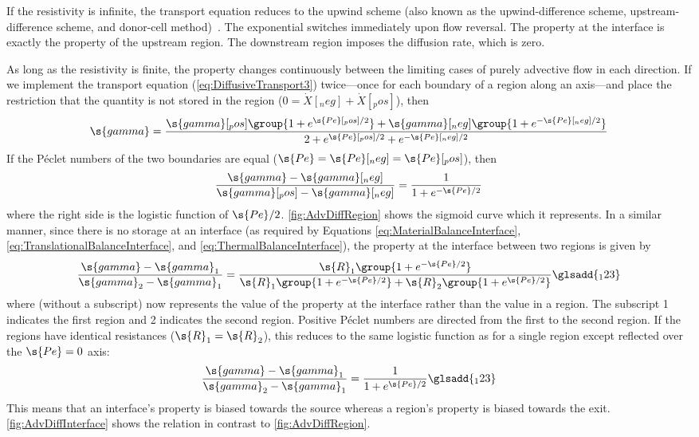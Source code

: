 If the resistivity is infinite, the transport equation reduces to the upwind scheme (also known as the upwind-difference scheme, upstream-difference scheme, and donor-cell method)~\cite{Patankar1980}. %
The exponential switches immediately upon flow reversal.  The property at the interface is exactly the property of the upstream region.  The downstream region imposes the diffusion rate, which is zero.

As long as the resistivity is finite, the property changes continuously between the limiting cases of purely advective flow in each direction.  If we implement the transport equation (\ref{eq:DiffusiveTransport3}) twice---once for each boundary of a region along an axis---and place the restriction that the quantity is not stored in the region ($0 = \dot{X}[_neg] + \dot{X}[_pos]$), then
\begin{equation}
  \s{gamma}  = \frac{\s{gamma}[_pos]\group{1 + e^{\s{Pe}[_pos]/2}} + \s{gamma}[_neg]\group{1 + e^{-\s{Pe}[_neg]/2}}}{2 + e^{\s{Pe}[_pos]/2} + e^{-\s{Pe}[_neg]/2}}
\end{equation}
If the P\'eclet numbers of the two boundaries are equal ($\s{Pe} = \s{Pe}[_neg] = \s{Pe}[_pos]$), then
\begin{equation}
  \label{eq:MixingRegion}
  \frac{\s{gamma} - \s{gamma}[_neg]}{\s{gamma}[_pos] - \s{gamma}[_neg]} = \frac{1}{1 + e^{-\s{Pe}/2}}%
\end{equation}
where the right side is the logistic function of $\s{Pe}/2$.  \autoref{fig:AdvDiffRegion} shows the sigmoid curve which it represents.  In a similar manner, since there is no storage at an interface (as required by Equations \ref{eq:MaterialBalanceInterface}, \ref{eq:TranslationalBalanceInterface}, and \ref{eq:ThermalBalanceInterface}), the property at the interface between two regions is given by
\begin{equation}
  \label{eq:Mixing}
  \frac{\s{gamma} - \s{gamma}_1}{\s{gamma}_2 - \s{gamma}_1} = \frac{\s{R}_1\group{1 + e^{-\s{Pe}/2}}}{\s{R}_1\group{1 + e^{-\s{Pe}/2}} + \s{R}_2\group{1 + e^{\s{Pe}/2}}}%
  \glsadd{_123}
\end{equation}
where  (without a subscript) now represents the value of the property at the interface rather than the value in a region.  The subscript 1 indicates the first region and 2 indicates the second region.  Positive P\'eclet numbers are directed from the first to the second region.  If the regions have identical resistances ($\s{R}_1 = \s{R}_2$), this reduces to the same logistic function as for a single region except reflected over the $\s{Pe} = 0$ axis:
\begin{equation}
  \label{eq:MixingMidplane}
  \frac{\s{gamma} - \s{gamma}_1}{\s{gamma}_2 - \s{gamma}_1} = \frac{1}{1 + e^{\s{Pe}/2}}%
  \glsadd{_123}
\end{equation}
This means that an interface's property is biased towards the source whereas a region's property is biased towards the exit.  \autoref{fig:AdvDiffInterface} shows the relation in contrast to \autoref{fig:AdvDiffRegion}.

